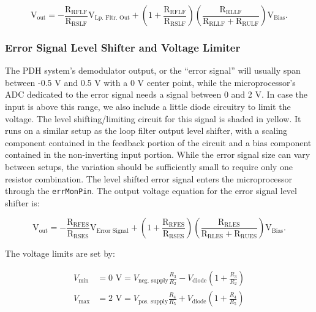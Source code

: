 \documentclass[10pt]{report}
\newcommand{\errMonPin}[0] {\texttt{errMonPin}}
\begin{document}
\begin{equation}
	\text{V}_{\text{out}}= -\frac{\text{R}_{\text{RFLF}}}{\text{R}_{\text{RSLF}}} \text{V}_{\text{Lp. Fltr. Out}} + \left(1+\frac{\text{R}_{\text{RFLF}}}{\text{R}_{\text{RSLF}}}\right)\left(\frac{\text{R}_{\text{RLLF}}}{\text{R}_{\text{RLLF}}+\text{R}_{\text{RULF}}}\right) \text{V}_{\text{Bias}}.
\end{equation}

\subsubsection{Error Signal Level Shifter \textbf{and} Voltage Limiter}

The PDH system's demodulator output, or the ``error signal'' will usually span between -0.5 V and 0.5 V with a 0 V center point, while the microprocessor's ADC dedicated to the error signal needs a signal between 0 and 2 V. In case the input is above this range, we also include a little diode circuitry to limit the voltage. The level shifting/limiting circuit for this signal is shaded in yellow. It runs on a similar setup as the loop filter output level shifter, with a scaling component contained in the feedback portion of the circuit and a bias component contained in the non-inverting input portion. While the error signal size can vary between setups, the variation should be sufficiently small to require only one resistor combination. The level shifted error signal enters the microprocessor through the \errMonPin. The output voltage equation for the error signal level shifter is:

\begin{equation}
	\text{V}_{\text{out}}= -\frac{\text{R}_{\text{RFES}}}{\text{R}_{\text{RSES}}} \text{V}_{\text{Error Signal}} + \left(1+\frac{\text{R}_{\text{RFES}}}{\text{R}_{\text{RSES}}}\right)\left(\frac{\text{R}_{\text{RLES}}}{\text{R}_{\text{RLES}}+\text{R}_{\text{RUES}}}\right) \text{V}_{\text{Bias}}.
\end{equation}

The voltage limits are set by:

\begin{align}
V_{\text{min}} &= 0\text{ V} = V_{\text{neg. supply}} \frac{R_3}{R_2} - V_\text{diode} \left(1 + \frac{R_3}{R_2}\right)\\
V_{\text{max}} &= 2\text{ V} = V_{\text{pos. supply}} \frac{R_4}{R_5} + V_\text{diode} \left(1 + \frac{R_4}{R_5}\right)
\end{align}
\end{document}
